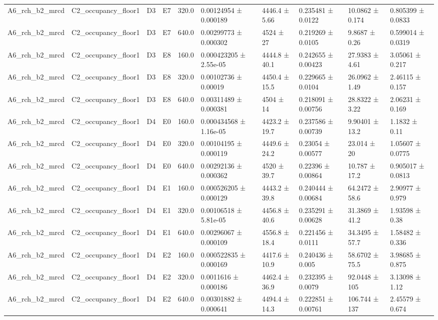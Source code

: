 \begin{table}
\begin{tabular}{llllllllll}
A6\_rch\_b2\_mrcd & C2\_occupancy\_floor1 & D3 & E7 & 320.0 & 0.00124954 ± 0.000189 & 4446.4 ± 5.66 & 0.235481 ± 0.0122 & 10.0862 ± 0.174 & 0.805399 ± 0.0833 \\
A6\_rch\_b2\_mrcd & C2\_occupancy\_floor1 & D3 & E7 & 640.0 & 0.00299773 ± 0.000302 & 4524 ± 27 & 0.219269 ± 0.0105 & 9.8687 ± 0.26 & 0.599014 ± 0.0319 \\
A6\_rch\_b2\_mrcd & C2\_occupancy\_floor1 & D3 & E8 & 160.0 & 0.000423205 ± 2.55e-05 & 4444.8 ± 40.1 & 0.242655 ± 0.00423 & 27.9383 ± 4.61 & 3.05061 ± 0.217 \\
A6\_rch\_b2\_mrcd & C2\_occupancy\_floor1 & D3 & E8 & 320.0 & 0.00102736 ± 0.00019 & 4450.4 ± 15.5 & 0.229665 ± 0.0104 & 26.0962 ± 1.49 & 2.46115 ± 0.157 \\
A6\_rch\_b2\_mrcd & C2\_occupancy\_floor1 & D3 & E8 & 640.0 & 0.00311489 ± 0.000381 & 4504 ± 14 & 0.218091 ± 0.00756 & 28.8322 ± 3.22 & 2.06231 ± 0.169 \\
A6\_rch\_b2\_mrcd & C2\_occupancy\_floor1 & D4 & E0 & 160.0 & 0.000434568 ± 1.16e-05 & 4423.2 ± 19.7 & 0.237586 ± 0.00739 & 9.90401 ± 13.2 & 1.1832 ± 0.11 \\
A6\_rch\_b2\_mrcd & C2\_occupancy\_floor1 & D4 & E0 & 320.0 & 0.00104195 ± 0.000119 & 4449.6 ± 24.2 & 0.23054 ± 0.00577 & 23.014 ± 20 & 1.05607 ± 0.0775 \\
A6\_rch\_b2\_mrcd & C2\_occupancy\_floor1 & D4 & E0 & 640.0 & 0.00292136 ± 0.000362 & 4520 ± 39.7 & 0.22396 ± 0.00864 & 10.787 ± 17.2 & 0.905017 ± 0.0813 \\
A6\_rch\_b2\_mrcd & C2\_occupancy\_floor1 & D4 & E1 & 160.0 & 0.000526205 ± 0.000129 & 4443.2 ± 39.8 & 0.240444 ± 0.00684 & 64.2472 ± 58.6 & 2.90977 ± 0.979 \\
A6\_rch\_b2\_mrcd & C2\_occupancy\_floor1 & D4 & E1 & 320.0 & 0.00106518 ± 5.81e-05 & 4456.8 ± 40.6 & 0.235291 ± 0.00628 & 31.3869 ± 41.2 & 1.93598 ± 0.38 \\
A6\_rch\_b2\_mrcd & C2\_occupancy\_floor1 & D4 & E1 & 640.0 & 0.00296067 ± 0.000109 & 4556.8 ± 18.4 & 0.221456 ± 0.0111 & 34.3495 ± 57.7 & 1.58482 ± 0.336 \\
A6\_rch\_b2\_mrcd & C2\_occupancy\_floor1 & D4 & E2 & 160.0 & 0.000522835 ± 0.000169 & 4417.6 ± 10.9 & 0.240436 ± 0.005 & 58.6702 ± 75.5 & 3.98685 ± 0.875 \\
A6\_rch\_b2\_mrcd & C2\_occupancy\_floor1 & D4 & E2 & 320.0 & 0.0011616 ± 0.000186 & 4462.4 ± 36.9 & 0.232395 ± 0.0079 & 92.0448 ± 105 & 3.13098 ± 1.12 \\
A6\_rch\_b2\_mrcd & C2\_occupancy\_floor1 & D4 & E2 & 640.0 & 0.00301882 ± 0.000641 & 4494.4 ± 14.3 & 0.222851 ± 0.00761 & 106.744 ± 137 & 2.45579 ± 0.674 \\

\end{tabular}
\end{table}
